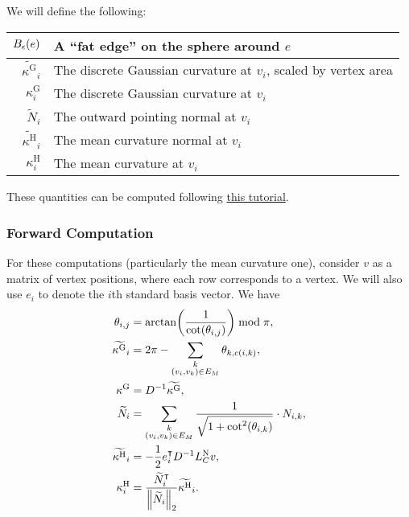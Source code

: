 
We will define the following: \begin{center}\begin{tabular}{r|l}
	\(B_{\epsilon}\pof{e}\) & A ``fat edge'' on the sphere around \(e\) \\ \hline
	\(\widetilde{\kappa^\text{G}}_i\) & The discrete Gaussian curvature at \(v_i\), scaled by vertex area \\ \hline
	\(\kappa^\text{G}_i\) & The discrete Gaussian curvature at \(v_i\) \\ \hline
	\(\widetilde{N}_i\) & The outward pointing normal at \(v_i\) \\ \hline
	\(\widetilde{\kappa^\text{H}}_i\) & The mean curvature normal at \(v_i\) \\ \hline
	\(\kappa^\text{H}_i\) & The mean curvature at \(v_i\)
\end{tabular}\end{center} These quantities can be computed following \href{https://libigl.github.io/libigl-python-bindings/tut-chapter1/}{this tutorial}.

\subsubsection{Forward Computation}
For these computations (particularly the mean curvature one), consider \(v\) as a matrix of vertex positions, where each row corresponds to a vertex. We will also use \(e_i\) to denote the \(i\)th standard basis vector. We have \begin{align*}
	\theta_{i, j} &= \arctan\pof{\frac{1}{\cot\pof{\theta_{i, j}}}} \bmod \pi, \\
	\widetilde{\kappa^\text{G}}_i &= 2\pi - \sum_{\substack{k \\ \pof{v_i, v_k} \in E_M}} \theta_{k, c\pof{i, k}}, \\
	\kappa^\text{G} &= D^{-1}\widetilde{\kappa^\text{G}}, \\
	\widetilde{N}_i &= \sum_{\substack{k \\ \pof{v_i, v_k} \in E_M}} \frac{1}{\sqrt{1 + \cot^2\pof{\theta_{i, k}}}} \cdot N_{i, k}, \\
	\widetilde{\kappa^\text{H}}_i &= -\frac{1}{2}e_i^\intercal D^{-1}L_C^{\text{N}}v, \\
	\kappa^\text{H}_i &= \frac{\widetilde{N}_i^\intercal}{\norm{\widetilde{N}_i}_2}\widetilde{\kappa^\text{H}}_i.
\end{align*}

